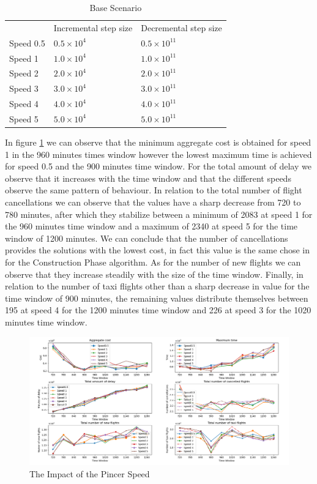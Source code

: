 	\begin{table}[h!]
		\centering
		\caption{Base Scenario}
		\label{tbl:pincerSpeed}
		\begin{tabular}{lll}
			\hline
			& Incremental step size     & Decremental step size      \\
			Speed 0.5 & $0.5 \times 10^{4}$ & $0.5 \times 10^{11}$ \\
			Speed 1   & $1.0 \times 10^{4}$ & $1.0 \times 10^{11}$ \\
			Speed 2   & $2.0 \times 10^{4}$ & $2.0 \times 10^{11}$ \\
			Speed 3   & $3.0 \times 10^{4}$ & $3.0 \times 10^{11}$ \\
			Speed 4   & $4.0 \times 10^{4}$ & $4.0 \times 10^{11}$ \\
			Speed 5   & $5.0 \times 10^{4}$ & $5.0 \times 10^{11}$ \\
			\hline
		\end{tabular}
	\end{table} 

In figure \ref{fig:speed} we can observe that the minimum aggregate cost is obtained for speed 1 in the 960 minutes times window however the lowest maximum time is achieved for speed 0.5 and the 900 minutes time window. For the total amount of delay we observe that it increases with the time window and that the different speeds observe the same pattern of behaviour. In relation to the total number of flight cancellations we can observe that the values have a sharp decrease from 720 to 780 minutes, after which they stabilize between a minimum of 2083 at speed 1 for the 960 minutes time window  and a maximum of 2340 at speed 5 for the time window of 1200 minutes. We can conclude that the number of cancellations provides the solutions with the lowest cost, in fact this value is the same chose in \citep{bisaillon2011} for the Construction Phase algorithm. As for the number of new flights we can observe that they increase steadily with the size of the time window. Finally, in relation to the number of taxi flights other than a sharp decrease in value for the time window of 900 minutes, the remaining values distribute themselves between 195 at speed 4 for the 1200 minutes time window and 226 at speed 3 for the 1020 minutes time window.
 
	\begin{figure}[h!]
		\centering
		\includegraphics[width=\textwidth]{figures/speed2x3_1.png}
		\caption[]{The Impact of the Pincer Speed}
		\label{fig:speed}
	\end{figure}

